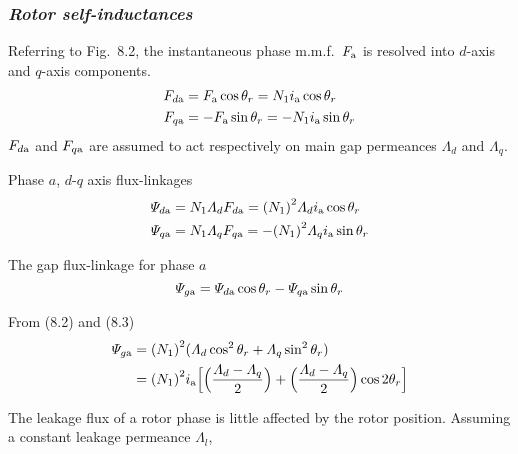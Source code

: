 \documentclass[a4paper,numbers=noenddot,12pt]{scrbook}
\begin{document}
    \subsubsection{\textit{Rotor self-inductances}}
    Referring to Fig.\ 8.2, the instantaneous phase m.m.f.\ $F_{\textup{a}}$ is resolved into $d$-axis and $q$-axis components.
    \begin{equation}
        \begin{aligned}
            F_{d\textup{a}} & = F_{\textup{a}} \cos \theta_r = N_1 i_{\textup{a}} \cos \theta_r \\
            F_{q\textup{a}} & = - F_{\textup{a}} \sin \theta_r = - N_1 i_{\textup{a}} \sin \theta_r
        \end{aligned}
        \label{eq:Eq8.1}
    \end{equation}
    $F_{d\textup{a}}$ and $F_{q\textup{a}}$ are assumed to act respectively on main gap permeances $\varLambda_d$ and $\varLambda_q$.

    Phase $a$, $d$-$q$ axis flux-linkages
    \begin{equation}
        \begin{aligned}
            \varPsi_{d\textup{a}} & = N_1 \varLambda_d F_{d\textup{a}} = {(N_1)}^2 \varLambda_d i_{\textup{a}} \cos \theta_r \\
            \varPsi_{q\textup{a}} & = N_1 \varLambda_q F_{q\textup{a}} = - {(N_1)}^2 \varLambda_q i_{\textup{a}} \sin \theta_r 
        \end{aligned}
        \label{eq:Eq8.2}
    \end{equation}

    The gap flux-linkage for phase $a$
    \begin{equation}
        \varPsi_{g\textup{a}} = \varPsi_{d\textup{a}} \cos \theta_r - \varPsi_{q\textup{a}} \sin \theta_r
        \label{eq:Eq8.3}
    \end{equation}

    From (8.2) and (8.3)
    \begin{align}
        \varPsi_{g\textup{a}} & = {(N_1)}^2(\varLambda_d \cos^2 \theta_r + \varLambda_q \sin^2 \theta_r) \nonumber \\
        & = {(N_1)}^2 i_{\textup{a}} \Big[ \Big(\dfrac{\varLambda_d -\varLambda_q}{2}\Big) + \Big( \dfrac{\varLambda_d - \varLambda_q}{2} \Big) \cos 2\theta_r \Big]
        \label{eq:Eq8.4}
    \end{align}

    The leakage flux of a rotor phase is little affected by the rotor position. Assuming a constant leakage permeance $\varLambda_l$,
\end{document}
